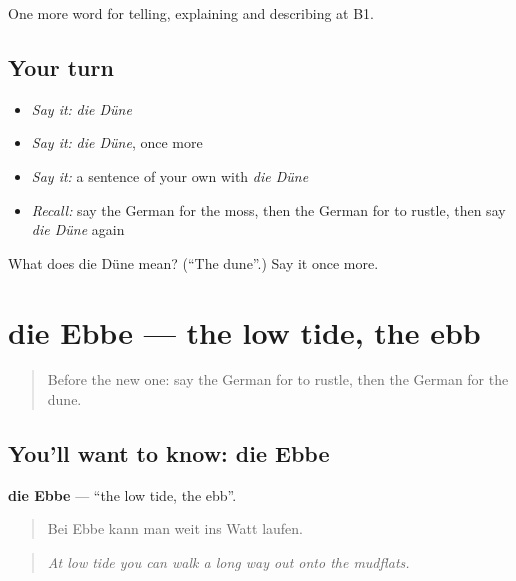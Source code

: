 \begin{grammarlens}[title={What you've built}]
One more word for telling, explaining and describing at B1.
\end{grammarlens}

\subsection*{Your turn}
\begin{itemize}
\raggedright
  \item \emph{Say it:} \emph{die Düne}
  \item \emph{Say it:} \emph{die Düne}, once more
  \item \emph{Say it:} a sentence of your own with \emph{die Düne}
  \item \emph{Recall:} say the German for the moss, then the German for to rustle, then say \emph{die Düne} again
\end{itemize}

\begin{tcolorbox}[breakable,colback=teal!4,colframe=teal!35!black,title={Before you move on}]
What does die Düne mean? (\textquotedblleft{}The dune\textquotedblright{}.) Say it once more.
\end{tcolorbox}
\section[die Ebbe]{die Ebbe — the low tide, the ebb}

\label{lesson:GE-C457-ebbe}



\begin{quote}
Before the new one: say the German for to rustle, then the German for the dune.
\end{quote}

\subsection*{You'll want to know: die Ebbe}
\textbf{die Ebbe} — \textquotedblleft{}the low tide, the ebb\textquotedblright{}.

\begin{quote}
Bei Ebbe kann man weit ins Watt laufen.
\end{quote}

\begin{quote}
\emph{At low tide you can walk a long way out onto the mudflats.}
\end{quote}

